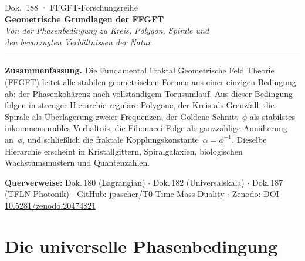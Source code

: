 
\thispagestyle{firstpage}
\begin{center}
  {\small\color{T0gray} Dok.~188 · FFGFT-Forschungsreihe}\\[6pt]
  {\LARGE\bfseries\color{T0blue}
    Geometrische Grundlagen der FFGFT}\\[6pt]
  {\large\itshape\color{T0gray}
    Von der Phasenbedingung zu Kreis, Polygon, Spirale und\\
    den bevorzugten Verhältnissen der Natur}\\[8pt]
  {\color{T0red}\rule{0.65\linewidth}{1.5pt}}
\end{center}
\vspace{4pt}

\begin{infobox}
\textbf{Zusammenfassung.}
Die Fundamental Fraktal Geometrische Feld Theorie (FFGFT) leitet alle
stabilen geometrischen Formen aus einer einzigen Bedingung ab: der
Phasenkohärenz nach vollständigem Torusumlauf. Aus dieser Bedingung
folgen in strenger Hierarchie reguläre Polygone, der Kreis als Grenzfall,
die Spirale als Überlagerung zweier Frequenzen, der Goldene Schnitt~$\phi$
als stabilstes inkommensurables Verhältnis, die Fibonacci-Folge als
ganzzahlige Annäherung an~$\phi$, und schließlich die fraktale
Kopplungskonstante~$\alpha = \phi^{-1}$. Dieselbe Hierarchie erscheint
in Kristallgittern, Spiralgalaxien, biologischen Wachstumsmustern und
Quantenzahlen.

\smallskip\noindent\textbf{Querverweise:}
Dok.\,180 (Lagrangian) $\cdot$
Dok.\,182 (Universalskala) $\cdot$
Dok.\,187 (TFLN-Photonik) $\cdot$
GitHub: \href{https://github.com/jpascher/T0-Time-Mass-Duality}{jpascher/T0-Time-Mass-Duality} $\cdot$
Zenodo: \href{https://zenodo.org/records/20474821}{DOI 10.5281/zenodo.20474821}
\end{infobox}

\tableofcontents
\bigskip

\section{Die universelle Phasenbedingung}

